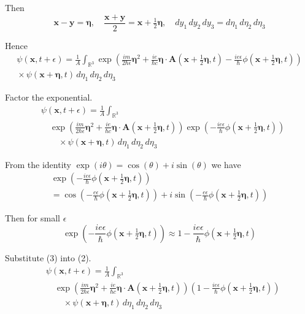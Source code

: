 \documentclass[12pt]{article}
\newcommand\INT{\int_{\mathbb R^3}}
\begin{document}
Then
\begin{equation*}
\mathbf x-\mathbf y=\boldsymbol\eta,\quad
\frac{\mathbf x+\mathbf y}{2}=\mathbf{x}+\tfrac{1}{2}\boldsymbol\eta,\quad
dy_1\,dy_2\,dy_3=d\eta_1\,d\eta_2\,d\eta_3
\end{equation*}

Hence
\begin{multline*}
\psi(\mathbf x,t+\epsilon)=
\frac{1}{A}\INT\exp
\left(
\frac{im}{2\hbar\epsilon}\boldsymbol\eta^2
+\frac{ie}{\hbar c}\boldsymbol\eta\cdot\mathbf A\left(\mathbf x+\tfrac{1}{2}\boldsymbol\eta,t\right)
-\frac{ie\epsilon}{\hbar}\phi\left(\mathbf x+\tfrac{1}{2}\boldsymbol\eta,t\right)
\right)
\\
{}\times\psi(\mathbf x+\boldsymbol\eta,t)
\,d\eta_1\,d\eta_2\,d\eta_3
\end{multline*}

Factor the exponential.
\begin{align*}
&\psi(\mathbf x,t+\epsilon)=
\frac{1}{A}\INT
\\
&\quad{}\exp
\left(
\frac{im}{2\hbar\epsilon}\boldsymbol\eta^2
+\frac{ie}{\hbar c}\boldsymbol\eta\cdot\mathbf A\left(\mathbf x+\tfrac{1}{2}\boldsymbol\eta,t\right)
\right)
\exp\left(-\frac{ie\epsilon}{\hbar}\phi\left(\mathbf x+\tfrac{1}{2}\boldsymbol\eta,t\right)\right)
\\
&\quad\quad{}\times\psi(\mathbf x+\boldsymbol\eta,t)
\,d\eta_1\,d\eta_2\,d\eta_3
\tag{2}
\end{align*}

From the identity $\exp(i\theta)=\cos(\theta)+i\sin(\theta)$ we have
\begin{multline*}
\exp\left(-\frac{ie\epsilon}{\hbar}\phi\left(\mathbf x+\tfrac{1}{2}\boldsymbol\eta,t\right)\right)
\\
=\cos\left(-\frac{e\epsilon}{\hbar}\phi\left(\mathbf x+\tfrac{1}{2}\boldsymbol\eta,t\right)\right)
+i\sin\left(-\frac{e\epsilon}{\hbar}\phi\left(\mathbf x+\tfrac{1}{2}\boldsymbol\eta,t\right)\right)
\end{multline*}

Then for small $\epsilon$
\begin{equation*}
\exp\left(-\frac{ie\epsilon}{\hbar}\phi\left(\mathbf x+\tfrac{1}{2}\boldsymbol\eta,t\right)\right)
\approx
1-\frac{ie\epsilon}{\hbar}\phi\left(\mathbf x+\tfrac{1}{2}\boldsymbol\eta,t\right)
\tag{3}
\end{equation*}

Substitute (3) into (2).
\begin{align*}
&\psi(\mathbf x,t+\epsilon)=
\frac{1}{A}\INT
\\
&\quad{}\exp
\left(
\frac{im}{2\hbar\epsilon}\boldsymbol\eta^2
+\frac{ie}{\hbar c}\boldsymbol\eta\cdot\mathbf A\left(\mathbf x+\tfrac{1}{2}\boldsymbol\eta,t\right)
\right)
\left(1-\frac{ie\epsilon}{\hbar}\phi\left(\mathbf x+\tfrac{1}{2}\boldsymbol\eta,t\right)\right)
\\
&\quad\quad{}\times\psi(\mathbf x+\boldsymbol\eta,t)
\,d\eta_1\,d\eta_2\,d\eta_3
\tag{4}
\end{align*}
\end{document}
